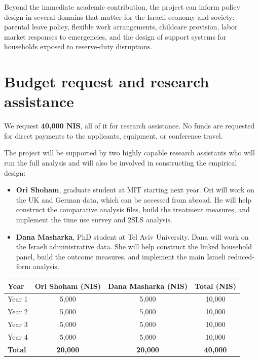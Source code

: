 \documentclass[12pt]{article}
\begin{document}
Beyond the immediate academic contribution, the project can inform policy design in several domains that matter for the Israeli economy and society: parental leave policy, flexible work arrangements, childcare provision, labor market responses to emergencies, and the design of support systems for households exposed to reserve-duty disruptions.

\section{Budget request and research assistance}

We request \textbf{40,000 NIS}, all of it for research assistance. No funds are requested for direct payments to the applicants, equipment, or conference travel.

The project will be supported by two highly capable research assistants who will run the full analysis and will also be involved in constructing the empirical design:
\begin{itemize}[leftmargin=1.2em]
    \item \textbf{Ori Shoham}, graduate student at MIT starting next year. Ori will work on the UK and German data, which can be accessed from abroad. He will help construct the comparative analysis files, build the treatment measures, and implement the time use survey and 2SLS analysis.
    \item \textbf{Dana Masharka}, PhD student at Tel Aviv University. Dana will work on the Israeli administrative data. She will help construct the linked household panel, build the outcome measures, and implement the main Israeli reduced-form analysis.
\end{itemize}

\begin{center}
\begin{tabularx}{0.95\textwidth}{>{\raggedright\arraybackslash}X c c c}
\toprule
\textbf{Year} & \textbf{Ori Shoham (NIS)} & \textbf{Dana Masharka (NIS)} & \textbf{Total (NIS)} \\
\midrule
Year 1 & 5,000 & 5,000 & 10,000 \\
Year 2 & 5,000 & 5,000 & 10,000 \\
Year 3 & 5,000 & 5,000 & 10,000 \\
Year 4 & 5,000 & 5,000 & 10,000 \\
\midrule
\textbf{Total} & \textbf{20,000} & \textbf{20,000} & \textbf{40,000} \\
\bottomrule
\end{tabularx}
\end{center}
\end{document}
